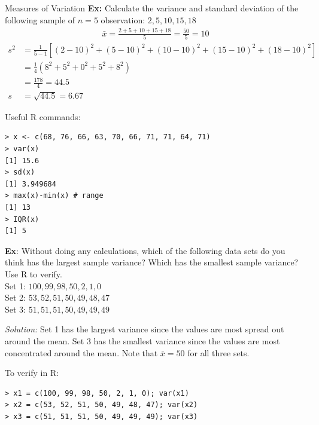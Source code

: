 \documentclass{beamer}
\begin{document}
\begin{frame}{Measures of Variation}
\textbf{Ex:}  Calculate the variance and standard deviation of the following sample of $n=5$ observation: $2, 5, 10, 15, 18$\\
\small
\begin{align*}
\bar{x} = \frac{2 + 5 + 10 + 15 + 18}{5}  = \frac{50}{5} = 10
\end{align*}
\begin{align*}
s^2 &= \frac{1}{5-1} [(2-10)^2 + (5-10)^2 + (10-10)^2 + (15-10)^2 + (18-10)^2]\\
&= \frac{1}{4} (8^2 + 5^2 + 0^2 + 5^2 + 8^2)\\
&= \frac{178}{4} = 44.5\\
s &= \sqrt{44.5} = \boxed{6.67}
\end{align*}
\end{frame}

\begin{frame}[fragile]
Useful R commands:
\begin{verbatim}
> x <- c(68, 76, 66, 63, 70, 66, 71, 71, 64, 71)
> var(x)
[1] 15.6
> sd(x)
[1] 3.949684
> max(x)-min(x) # range
[1] 13
> IQR(x)
[1] 5
\end{verbatim}
\end{frame}

\begin{frame}[fragile]
\small
\textbf{Ex}:  Without doing any calculations, which of the following data sets do you think has the largest sample variance?  Which has the smallest sample variance?  Use R to verify.\\

\vspace{10pt}
Set 1: $100, 99, 98, 50, 2, 1, 0$\\ 
Set 2: $53, 52, 51, 50, 49, 48, 47$\\
Set 3: $51, 51, 51, 50, 49, 49, 49$\\
\vspace{10pt}
{\color{blue}
\emph{Solution:} Set 1 has the largest variance since the values are most spread out around the mean.  Set 3 has the smallest variance since the values are most concentrated around the mean.  Note that $\bar{x} = 50$ for all three sets.\\
\vspace{10pt}

To verify in R:
\vspace{-5pt}
\begin{verbatim}
> x1 = c(100, 99, 98, 50, 2, 1, 0); var(x1)
> x2 = c(53, 52, 51, 50, 49, 48, 47); var(x2)
> x3 = c(51, 51, 51, 50, 49, 49, 49); var(x3)
\end{verbatim}
}
\end{frame}
\end{document}
